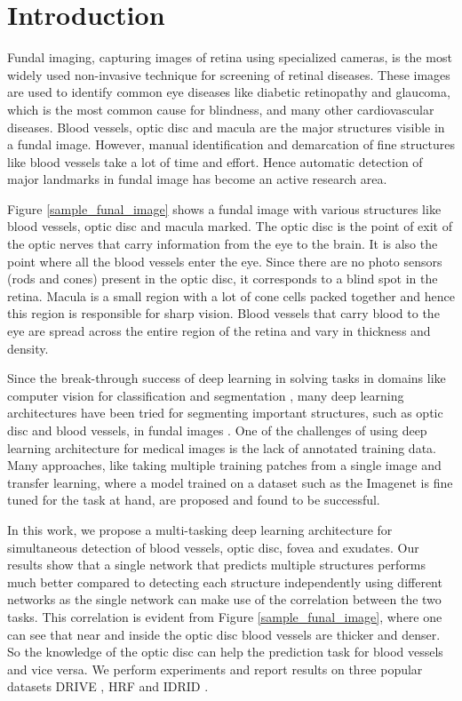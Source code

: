\documentclass{article}
\begin{document}
\section{Introduction}
Fundal imaging, capturing images of retina using specialized cameras, is the most widely used non-invasive technique for screening of retinal diseases.
These images are used to identify common eye diseases like diabetic retinopathy and glaucoma, which is the most common cause for blindness, and many other cardiovascular diseases.  Blood vessels, optic disc and macula are the major structures visible in a fundal image.  However, manual identification and demarcation of fine structures like blood vessels take a lot of time and effort. Hence automatic detection of major landmarks in fundal image has become an active research area.

Figure \ref{sample_funal_image} shows a fundal image with various structures like blood vessels, optic disc and macula marked.
The optic disc is the point of exit of the optic nerves that carry information from the eye to the brain.
It is also the point where all the blood vessels enter the eye.
Since there are no photo sensors (rods and cones) present in the optic disc, it corresponds to a blind spot in the retina.
Macula is a small region with a lot of cone cells packed together and hence this region is responsible for sharp vision.
Blood vessels that carry blood to the eye are spread across the entire region of the retina and vary in thickness and density.

Since the break-through success of deep learning in solving tasks in domains like computer vision for classification \cite{krizhevsky2012imagenet} \cite{simonyan2014very} and segmentation \cite{chen2017deeplab}, many deep learning architectures have been tried for segmenting important structures, such as optic disc and blood vessels, in fundal images \cite {vengalil2016customizing} \cite{zhuang2018laddernet} \cite{jiang2018retinal} \cite{park2020m}.
One of the challenges of using deep learning architecture for medical images is the lack of annotated training data.
Many approaches, like taking multiple training patches from  a single image \cite{vengalil2016customizing} and transfer learning, where a model trained on a dataset such as the Imagenet \cite{deng2009imagenet} is fine tuned for the task at hand, are proposed and found to be successful.

In this work, we propose a multi-tasking deep learning architecture for simultaneous detection of blood vessels, optic disc, fovea and exudates.
Our results show that a single network that predicts multiple structures  performs much better compared to detecting  each structure independently using different networks as the single network can make use of the correlation between the two tasks.
This correlation is evident from Figure \ref{sample_funal_image}, where one can see that near and inside the optic disc blood vessels are thicker and denser.
So the knowledge of the optic disc can help the prediction task for blood vessels and vice versa.
We perform experiments and report results on three popular datasets DRIVE \cite{drive}, HRF \cite{budai2013robust} and IDRID \cite{h25w98-18}.
\end{document}
